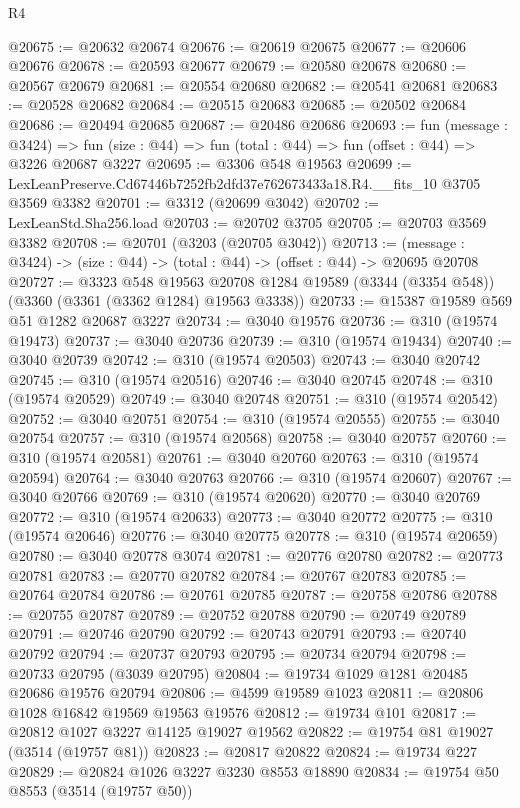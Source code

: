 \begin{lexlean}{R4}
\begin{coremodule}
@20675 := @20632 @20674
@20676 := @20619 @20675
@20677 := @20606 @20676
@20678 := @20593 @20677
@20679 := @20580 @20678
@20680 := @20567 @20679
@20681 := @20554 @20680
@20682 := @20541 @20681
@20683 := @20528 @20682
@20684 := @20515 @20683
@20685 := @20502 @20684
@20686 := @20494 @20685
@20687 := @20486 @20686
@20693 := fun (message : @3424) =>
  fun (size : @44) => fun (total : @44) => fun (offset : @44) => @3226 @20687 @3227
@20695 := @3306 @548 @19563
@20699 := LexLeanPreserve.Cd67446b7252fb2dfd37e762673433a18.R4.__fits_10 @3705 @3569 @3382
@20701 := @3312 (@20699 @3042)
@20702 := LexLeanStd.Sha256.load
@20703 := @20702 @3705
@20705 := @20703 @3569 @3382
@20708 := @20701 (@3203 (@20705 @3042))
@20713 := (message : @3424) -> (size : @44) -> (total : @44) -> (offset : @44) -> @20695 @20708
@20727 := @3323
    @548
    @19563
    @20708
    @1284
    @19589
    (@3344 (@3354 @548))
    (@3360 (@3361 (@3362 @1284) @19563 @3338))
@20733 := @15387 @19589 @569 @51 @1282 @20687 @3227
@20734 := @3040 @19576
@20736 := @310 (@19574 @19473)
@20737 := @3040 @20736
@20739 := @310 (@19574 @19434)
@20740 := @3040 @20739
@20742 := @310 (@19574 @20503)
@20743 := @3040 @20742
@20745 := @310 (@19574 @20516)
@20746 := @3040 @20745
@20748 := @310 (@19574 @20529)
@20749 := @3040 @20748
@20751 := @310 (@19574 @20542)
@20752 := @3040 @20751
@20754 := @310 (@19574 @20555)
@20755 := @3040 @20754
@20757 := @310 (@19574 @20568)
@20758 := @3040 @20757
@20760 := @310 (@19574 @20581)
@20761 := @3040 @20760
@20763 := @310 (@19574 @20594)
@20764 := @3040 @20763
@20766 := @310 (@19574 @20607)
@20767 := @3040 @20766
@20769 := @310 (@19574 @20620)
@20770 := @3040 @20769
@20772 := @310 (@19574 @20633)
@20773 := @3040 @20772
@20775 := @310 (@19574 @20646)
@20776 := @3040 @20775
@20778 := @310 (@19574 @20659)
@20780 := @3040 @20778 @3074
@20781 := @20776 @20780
@20782 := @20773 @20781
@20783 := @20770 @20782
@20784 := @20767 @20783
@20785 := @20764 @20784
@20786 := @20761 @20785
@20787 := @20758 @20786
@20788 := @20755 @20787
@20789 := @20752 @20788
@20790 := @20749 @20789
@20791 := @20746 @20790
@20792 := @20743 @20791
@20793 := @20740 @20792
@20794 := @20737 @20793
@20795 := @20734 @20794
@20798 := @20733 @20795 (@3039 @20795)
@20804 := @19734 @1029 @1281 @20485 @20686 @19576 @20794
@20806 := @4599 @19589 @1023
@20811 := @20806 @1028 @16842 @19569 @19563 @19576
@20812 := @19734 @101
@20817 := @20812 @1027 @3227 @14125 @19027 @19562
@20822 := @19754 @81 @19027 (@3514 (@19757 @81))
@20823 := @20817 @20822
@20824 := @19734 @227
@20829 := @20824 @1026 @3227 @3230 @8553 @18890
@20834 := @19754 @50 @8553 (@3514 (@19757 @50))

\end{coremodule}
\end{lexlean}
